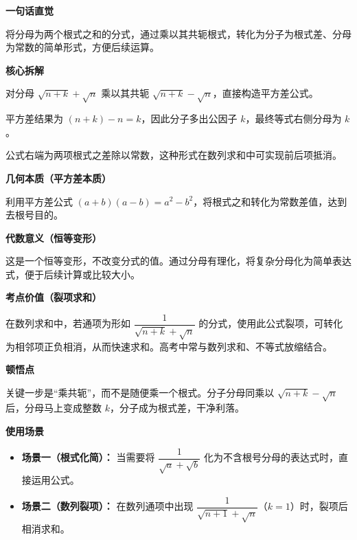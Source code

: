 \begin{explanationbox}
	\textbf{\textcolor{CExplanation}{一句话直觉}}

	将分母为两个根式之和的分式，通过乘以其共轭根式，转化为分子为根式差、分母为常数的简单形式，方便后续运算。

	\medskip
	\textbf{\textcolor{CExplanation}{核心拆解}}
	\begin{description}[style=nextline, leftmargin=2.8em, labelsep=0.5em, itemsep=0.45em]
		\item[\textbf{要点一（平方差运用）：}] 对分母 $\sqrt{n+k}+\sqrt{n}$ 乘以其共轭 $\sqrt{n+k}-\sqrt{n}$，直接构造平方差公式。
		\item[\textbf{要点二（系数出现）：}] 平方差结果为 $(n+k)-n=k$，因此分子多出公因子 $k$，最终等式右侧分母为 $k$。
		\item[\textbf{要点三（裂项结构）：}] 公式右端为两项根式之差除以常数，这种形式在数列求和中可实现前后项抵消。
	\end{description}

	\medskip
	\textbf{\textcolor{CExplanation}{几何本质（平方差本质）}}

	利用平方差公式 $(a+b)(a-b)=a^{2}-b^{2}$，将根式之和转化为常数差值，达到去根号目的。

	\medskip
	\textbf{\textcolor{CExplanation}{代数意义（恒等变形）}}

	这是一个恒等变形，不改变分式的值。通过分母有理化，将复杂分母化为简单表达式，便于后续计算或比较大小。

	\medskip
	\textbf{\textcolor{CExplanation}{考点价值（裂项求和）}}

	在数列求和中，若通项为形如 $\dfrac{1}{\sqrt{n+k}+\sqrt{n}}$ 的分式，使用此公式裂项，可转化为相邻项正负相消，从而快速求和。高考中常与数列求和、不等式放缩结合。

	\medskip
	\textbf{\textcolor{CExplanation}{顿悟点}}

	关键一步是“乘共轭”，而不是随便乘一个根式。分子分母同乘以 $\sqrt{n+k}-\sqrt{n}$ 后，分母马上变成整数 $k$，分子成为根式差，干净利落。

	\medskip
	\textbf{\textcolor{CExplanation}{使用场景}}
	\begin{itemize}[leftmargin=*, itemsep=0.5em, topsep=0.4em]
		\item \textbf{场景一（根式化简）：} 当需要将 $\dfrac{1}{\sqrt{a}+\sqrt{b}}$ 化为不含根号分母的表达式时，直接运用公式。
		\item \textbf{场景二（数列裂项）：} 在数列通项中出现 $\dfrac{1}{\sqrt{n+1}+\sqrt{n}}$（$k=1$）时，裂项后相消求和。
	\end{itemize}
\end{explanationbox}
